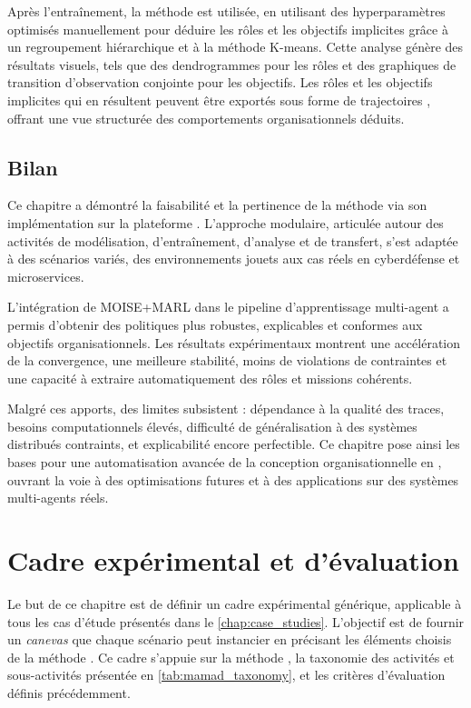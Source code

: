 Après l'entraînement, la méthode  est utilisée, en utilisant des hyperparamètres optimisés manuellement pour déduire les rôles et les objectifs implicites grâce à un regroupement hiérarchique et à la méthode K-means. Cette analyse génère des résultats visuels, tels que des dendrogrammes pour les rôles et des graphiques de transition d'observation conjointe pour les objectifs. Les rôles et les objectifs implicites qui en résultent peuvent être exportés sous forme de trajectoires , offrant une vue structurée des comportements organisationnels déduits.

\section{Bilan}

Ce chapitre a démontré la faisabilité et la pertinence de la méthode  via son implémentation sur la plateforme . L’approche modulaire, articulée autour des activités de modélisation, d’entraînement, d’analyse et de transfert, s’est adaptée à des scénarios variés, des environnements jouets aux cas réels en cyberdéfense et microservices.

L’intégration de MOISE+MARL dans le pipeline d’apprentissage multi-agent a permis d’obtenir des politiques plus robustes, explicables et conformes aux objectifs organisationnels. Les résultats expérimentaux montrent une accélération de la convergence, une meilleure stabilité, moins de violations de contraintes et une capacité à extraire automatiquement des rôles et missions cohérents.

Malgré ces apports, des limites subsistent : dépendance à la qualité des traces, besoins computationnels élevés, difficulté de généralisation à des systèmes distribués contraints, et explicabilité encore perfectible. Ce chapitre pose ainsi les bases pour une automatisation avancée de la conception organisationnelle en , ouvrant la voie à des optimisations futures et à des applications sur des systèmes multi-agents réels.

\clearpage
\thispagestyle{empty}
\null
\newpage


\chapter{Cadre expérimental et d'évaluation}
\label{chap:cadre_experimental}

Le but de ce chapitre est de définir un cadre expérimental générique, applicable à tous les cas d'étude présentés dans le \autoref{chap:case_studies}. L'objectif est de fournir un \textit{canevas} que chaque scénario peut instancier en précisant les éléments choisis de la méthode . Ce cadre s'appuie sur la méthode , la taxonomie des activités et sous-activités présentée en \autoref{tab:mamad_taxonomy}, et les critères d'évaluation définis précédemment.

